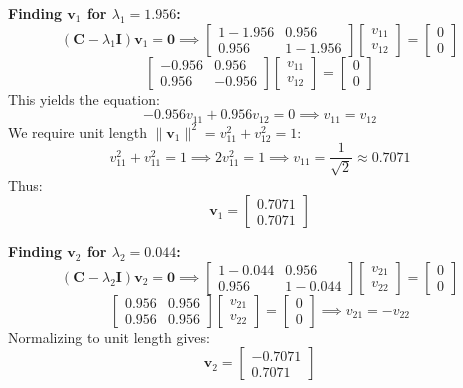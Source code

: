 \documentclass[11pt, a4paper]{article}
\begin{document}
\textbf{Finding $\mathbf{v}_1$ for $\lambda_1 = 1.956$:}
$$(\mathbf{C} - \lambda_1 \mathbf{I}) \mathbf{v}_1 = \mathbf{0} \implies \begin{bmatrix}
1 - 1.956 & 0.956 \\
0.956 & 1 - 1.956
\end{bmatrix} \begin{bmatrix} v_{11} \\ v_{12} \end{bmatrix} = \begin{bmatrix} 0 \\ 0 \end{bmatrix}$$
$$\begin{bmatrix}
-0.956 & 0.956 \\
0.956 & -0.956
\end{bmatrix} \begin{bmatrix} v_{11} \\ v_{12} \end{bmatrix} = \begin{bmatrix} 0 \\ 0 \end{bmatrix}$$
This yields the equation:
$$-0.956 v_{11} + 0.956 v_{12} = 0 \implies v_{11} = v_{12}$$
We require unit length $\|\mathbf{v}_1\|^2 = v_{11}^2 + v_{12}^2 = 1$:
$$v_{11}^2 + v_{11}^2 = 1 \implies 2 v_{11}^2 = 1 \implies v_{11} = \frac{1}{\sqrt{2}} \approx 0.7071$$
Thus:
$$\mathbf{v}_1 = \begin{bmatrix} 0.7071 \\[0.2em] 0.7071 \end{bmatrix}$$

\textbf{Finding $\mathbf{v}_2$ for $\lambda_2 = 0.044$:}
$$(\mathbf{C} - \lambda_2 \mathbf{I}) \mathbf{v}_2 = \mathbf{0} \implies \begin{bmatrix}
1 - 0.044 & 0.956 \\
0.956 & 1 - 0.044
\end{bmatrix} \begin{bmatrix} v_{21} \\ v_{22} \end{bmatrix} = \begin{bmatrix} 0 \\ 0 \end{bmatrix}$$
$$\begin{bmatrix}
0.956 & 0.956 \\
0.956 & 0.956
\end{bmatrix} \begin{bmatrix} v_{21} \\ v_{22} \end{bmatrix} = \begin{bmatrix} 0 \\ 0 \end{bmatrix} \implies v_{21} = -v_{22}$$
Normalizing to unit length gives:
$$\mathbf{v}_2 = \begin{bmatrix} -0.7071 \\[0.2em] 0.7071 \end{bmatrix}$$
\end{document}

